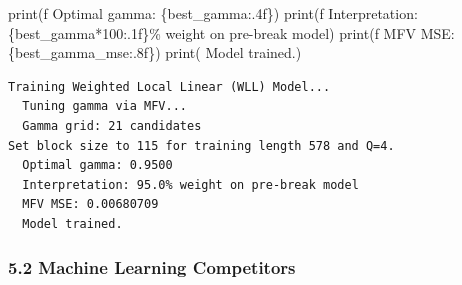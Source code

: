 \documentclass[
  letterpaper,
  DIV=11,
  numbers=noendperiod]{scrartcl}
\newenvironment{Shaded}{\begin{snugshade}}{\end{snugshade}}
\newcommand{\BuiltInTok}[1]{\textcolor[rgb]{0.00,0.23,0.31}{#1}}
\newcommand{\DecValTok}[1]{\textcolor[rgb]{0.68,0.00,0.00}{#1}}
\newcommand{\NormalTok}[1]{\textcolor[rgb]{0.00,0.23,0.31}{#1}}
\newcommand{\OperatorTok}[1]{\textcolor[rgb]{0.37,0.37,0.37}{#1}}
\newcommand{\SpecialCharTok}[1]{\textcolor[rgb]{0.37,0.37,0.37}{#1}}
\newcommand{\SpecialStringTok}[1]{\textcolor[rgb]{0.13,0.47,0.30}{#1}}
\newcommand{\StringTok}[1]{\textcolor[rgb]{0.13,0.47,0.30}{#1}}
\begin{document}
\begin{Shaded}
\begin{Highlighting}[]
\BuiltInTok{print}\NormalTok{(}\SpecialStringTok{f\textquotesingle{}  Optimal gamma: }\SpecialCharTok{\{}\NormalTok{best\_gamma}\SpecialCharTok{:.4f\}}\SpecialStringTok{\textquotesingle{}}\NormalTok{)}
\BuiltInTok{print}\NormalTok{(}\SpecialStringTok{f\textquotesingle{}  Interpretation: }\SpecialCharTok{\{}\NormalTok{best\_gamma}\OperatorTok{*}\DecValTok{100}\SpecialCharTok{:.1f\}}\SpecialStringTok{\% weight on pre{-}break model\textquotesingle{}}\NormalTok{)}
\BuiltInTok{print}\NormalTok{(}\SpecialStringTok{f\textquotesingle{}  MFV MSE: }\SpecialCharTok{\{}\NormalTok{best\_gamma\_mse}\SpecialCharTok{:.8f\}}\SpecialStringTok{\textquotesingle{}}\NormalTok{)}
\BuiltInTok{print}\NormalTok{(}\StringTok{\textquotesingle{}  Model trained.\textquotesingle{}}\NormalTok{)}
\end{Highlighting}
\end{Shaded}

\begin{verbatim}
Training Weighted Local Linear (WLL) Model...
  Tuning gamma via MFV...
  Gamma grid: 21 candidates
Set block size to 115 for training length 578 and Q=4.
  Optimal gamma: 0.9500
  Interpretation: 95.0% weight on pre-break model
  MFV MSE: 0.00680709
  Model trained.
\end{verbatim}

\subsubsection{5.2 Machine Learning
Competitors}\label{machine-learning-competitors}
\end{document}
